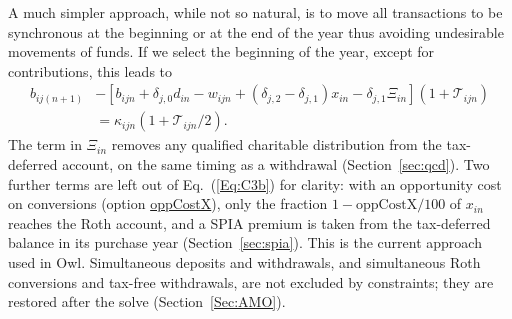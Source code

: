 \documentclass[fleqn,12pt]{report}
\newcommand{\code}[1]{\url{#1}}
\begin{document}
	A much simpler approach, while not so natural,
	is to move all transactions to be synchronous at the beginning or at the end of the year
	thus avoiding undesirable movements of funds.
	If we select the beginning of the year, except for contributions, this leads to
	\begin{equation}
		\label{Eq:C3b}
		\begin{aligned}
		b_{ij(n+1)}
		&- [b_{ijn} + \delta_{j, 0} d_{in} - w_{ijn} + (\delta_{j, 2} - \delta_{j, 1})x_{in}
		- \delta_{j, 1}\Xi_{in}](1 + \mathcal{T}_{ijn}) \\
		&= \kappa_{ijn} (1 + \mathcal{T}_{ijn}/2).
		\end{aligned}
	\end{equation}
The term in $\Xi_{in}$ removes any qualified charitable distribution from the
tax-deferred account, on the same timing as a withdrawal (Section~\ref{sec:qcd}).
Two further terms are left out of Eq.~(\ref{Eq:C3b}) for clarity: with an opportunity cost
on conversions (option \code{oppCostX}), only the fraction $1 - \textrm{oppCostX}/100$ of $x_{in}$
reaches the Roth account, and a SPIA premium is taken from the tax-deferred balance in its
purchase year (Section~\ref{sec:spia}).
This is the current approach used in Owl.  Simultaneous deposits and withdrawals, and
	simultaneous Roth conversions and tax-free withdrawals, are not excluded by constraints;
	they are restored after the solve (Section~\ref{Sec:AMO}).
\end{document}

